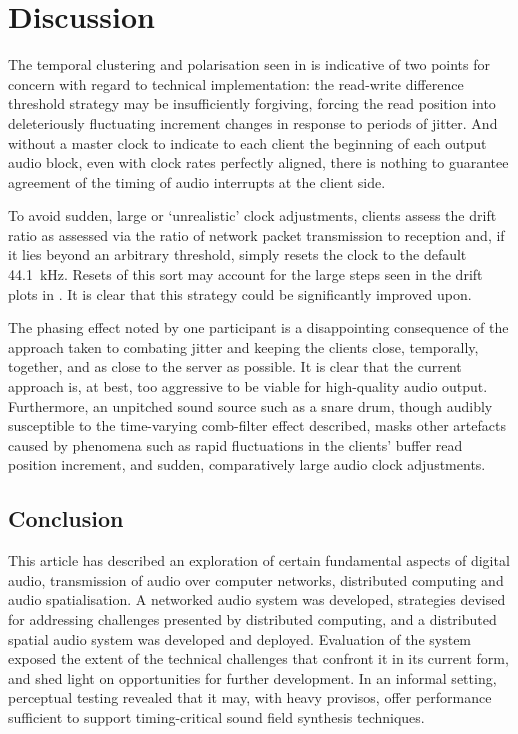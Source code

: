 \section{Discussion}\label{sec:discussion}

The temporal clustering and polarisation seen in
 is indicative of two points for
concern with regard to technical implementation:
the read-write difference threshold strategy may be insufficiently forgiving,
forcing the read position into deleteriously fluctuating increment changes in
response to periods of jitter.
And without a master clock to indicate to each client the beginning of each
output audio block, even with clock rates perfectly aligned, there is nothing
to guarantee agreement of the timing of audio interrupts at the client side.

To avoid sudden, large or `unrealistic' clock adjustments, clients assess
the drift ratio as assessed via the ratio of network packet
transmission to reception and, if it lies beyond an arbitrary threshold,
simply resets the clock to the default \qty{44.1}{\kHz}.
Resets of this sort may account for the large steps seen in the drift plots
in .
It is clear that this strategy could be significantly improved upon.

The phasing effect noted by one participant is a disappointing consequence
of the approach taken to combating jitter and keeping the clients close,
temporally, together, and as close to the server as possible.
It is clear that the current approach is, at best, too aggressive to be viable
for high-quality audio output.
Furthermore, an unpitched sound source such as a snare drum, though audibly
susceptible to the time-varying comb-filter effect described, masks other
artefacts caused by phenomena such as rapid fluctuations in the clients' buffer
read position increment, and sudden, comparatively large audio clock
adjustments.

\subsection{Conclusion}\label{subsec:conclusion}

This article has described an exploration of certain fundamental aspects of
digital audio, transmission of audio over computer networks, distributed
computing and audio spatialisation.
A networked audio system was developed, strategies devised for
addressing challenges presented by distributed computing,
and a distributed spatial audio system was developed and deployed.
Evaluation of the system exposed the extent of the technical challenges
that confront it in its current form, and shed light on opportunities for
further development.
In an informal setting, perceptual testing revealed that it may, with heavy
provisos, offer performance sufficient to support timing-critical sound field
synthesis techniques.

